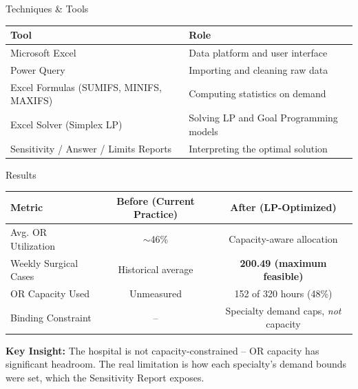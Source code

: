 \documentclass[aspectratio=169]{beamer}
\begin{document}
\begin{frame}{Techniques \& Tools}
    \begin{center}
    \begin{tabular}{ll}
        \toprule
        \textbf{Tool} & \textbf{Role} \\
        \midrule
        Microsoft Excel & Data platform and user interface \\
        Power Query & Importing and cleaning raw data \\
        Excel Formulas (SUMIFS, MINIFS, MAXIFS) & Computing statistics on demand \\
        Excel Solver (Simplex LP) & Solving LP and Goal Programming models \\
        Sensitivity / Answer / Limits Reports & Interpreting the optimal solution \\
        \bottomrule
    \end{tabular}
    \end{center}
\end{frame}

\begin{frame}{Results}
    \begin{center}
    \begin{tabular}{lcc}
        \toprule
        \textbf{Metric} & \textbf{Before (Current Practice)} & \textbf{After (LP-Optimized)} \\
        \midrule
        Avg. OR Utilization & $\sim$46\% & Capacity-aware allocation \\
        Weekly Surgical Cases & Historical average & \textbf{200.49 (maximum feasible)} \\
        OR Capacity Used & Unmeasured & 152 of 320 hours (48\%) \\
        Binding Constraint & -- & Specialty demand caps, \emph{not} capacity \\
        \bottomrule
    \end{tabular}
    \end{center}
    \vspace{10pt}
    \textbf{Key Insight:} The hospital is not capacity-constrained -- OR
    capacity has significant headroom. The real limitation is how each
    specialty's demand bounds were set, which the Sensitivity Report exposes.
\end{frame}
\end{document}
